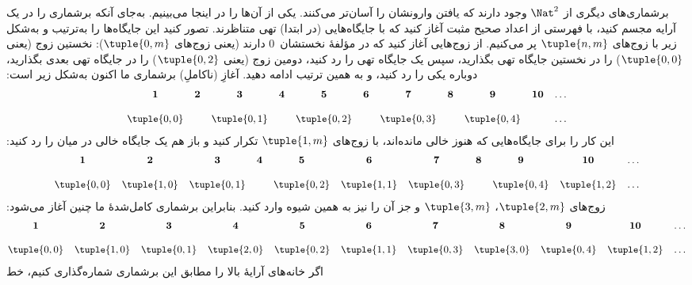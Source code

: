 {
  برشماری‌های دیگری از $\Nat^2$ وجود دارند که یافتن وارونشان را آسان‌تر
  می‌کنند. یکی از آن‌ها را در اینجا می‌بینیم. به‌جای آنکه برشماری را در
  یک آرایه مجسم کنید، با فهرستی از اعداد صحیح مثبت آغاز کنید که با
  جایگاه‌هایی (در ابتدا) تهی متناظرند. تصور کنید این جایگاه‌ها را به‌ترتیب
  و به‌شکل زیر با زوج‌های $\tuple{n,m}$ پر می‌کنیم. از زوج‌هایی آغاز کنید
  که در مؤلفهٔ نخستشان~$0$ دارند (یعنی زوج‌های $\tuple{0,m}$): نخستین زوج
  (یعنی $\tuple{0,0}$) را در نخستین جایگاه تهی بگذارید، سپس یک جایگاه تهی
  را رد کنید، دومین زوج (یعنی $\tuple{0,2}$) را در جایگاه تهی بعدی بگذارید،
  دوباره یکی را رد کنید، و به همین ترتیب ادامه دهید. آغازِ (ناکاملِ)
  برشماری ما اکنون به‌شکل زیر است:
  \[\small
  \begin{array}{@{}c c c c c c c c c c c@{}}
  \mathbf 1 & \mathbf 2 & \mathbf 3 & \mathbf 4 & \mathbf 5 & \mathbf 6 & \mathbf 7 & \mathbf 8 & \mathbf 9 & \mathbf{10} & \dots \\ \\
  \tuple{0,0} &  & \tuple{0,1} &  & \tuple{0,2} &  & \tuple{0,3} & & \tuple{0,4} &  & \dots \\
  \end{array}
  \]
  این کار را برای جایگاه‌هایی که هنوز خالی مانده‌اند، با زوج‌های
  $\tuple{1,m}$ تکرار کنید و باز هم یک جایگاه خالی در میان را رد کنید:
  \[\small
  \begin{array}{@{}c c c c c c c c c c c@{}}
  \mathbf 1 & \mathbf 2 & \mathbf 3 & \mathbf 4 & \mathbf 5 & \mathbf 6 & \mathbf 7 & \mathbf 8 & \mathbf 9 & \mathbf{10} & \dots \\ \\
  \tuple{0,0} & \tuple{1,0} & \tuple{0,1} &  & \tuple{0,2} & \tuple{1,1} &
  \tuple{0,3} & & \tuple{0,4} &  \tuple{1,2} & \dots \\
  \end{array}
  \]
  زوج‌های $\tuple{2,m}$، $\tuple{3,m}$ و جز آن را نیز به همین شیوه وارد
  کنید. بنابراین برشماری کامل‌شدهٔ ما چنین آغاز می‌شود:
  \[\small
  \begin{array}{@{}cc c c c c c c c c c@{}}
  \mathbf 1 & \mathbf 2 & \mathbf 3 & \mathbf 4 & \mathbf 5 & \mathbf 6 & \mathbf 7 & \mathbf 8 & \mathbf 9 & \mathbf{10} & \dots \\ \\
  \tuple{0,0} & \tuple{1,0} & \tuple{0,1} & \tuple{2,0}  & \tuple{0,2} &
  \tuple{1,1} & \tuple{0,3} & \tuple{3,0}  & \tuple{0,4} &  \tuple{1,2} & \dots \\
  \end{array}
  \]
  اگر خانه‌های آرایهٔ بالا را مطابق این برشماری شماره‌گذاری کنیم، خط
}
